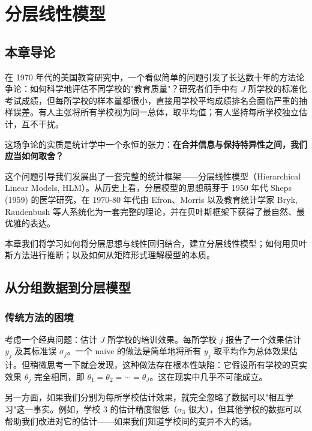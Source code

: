 
\chapter{分层线性模型}
\label{ch:hlm}

\section{本章导论}
\label{sec:ch15-intro}

在 1970 年代的美国教育研究中，一个看似简单的问题引发了长达数十年的方法论争论：如何科学地评估不同学校的"教育质量"？研究者们手中有 $J$ 所学校的标准化考试成绩，但每所学校的样本量都很小，直接用学校平均成绩排名会面临严重的抽样误差。有人主张将所有学校视为同一总体，取平均值；有人坚持每所学校独立估计，互不干扰。

这场争论的实质是统计学中一个永恒的张力：\textbf{在合并信息与保持特异性之间，我们应当如何取舍？}

这个问题引导我们发展出了一套完整的统计框架——分层线性模型（Hierarchical Linear Models, HLM）。从历史上看，分层模型的思想萌芽于 1950 年代 Sheps (1959) 的医学研究，在 1970-80 年代由 Efron、Morris 以及教育统计学家 Bryk, Raudenbush 等人系统化为一套完整的理论，并在贝叶斯框架下获得了最自然、最优雅的表达。

本章我们将学习如何将分层思想与线性回归结合，建立分层线性模型；如何用贝叶斯方法进行推断；以及如何从矩阵形式理解模型的本质。

\section{从分组数据到分层模型}
\label{sec:grouped-to-hierarchical}

\subsection{传统方法的困境}
\label{sec:traditional-dilemma}

考虑一个经典问题：估计 $J$ 所学校的培训效果。每所学校 $j$ 报告了一个效果估计 $y_j$ 及其标准误 $\sigma_j$。一个 naive 的做法是简单地将所有 $y_j$ 取平均作为总体效果估计。但稍微思考一下就会发现，这种做法存在根本性缺陷：它假设所有学校的真实效果 $\theta_j$ 完全相同，即 $\theta_1 = \theta_2 = \cdots = \theta_J$。这在现实中几乎不可能成立。

另一方面，如果我们分别为每所学校估计效果，就完全忽略了数据可以"相互学习"这一事实。例如，学校 3 的估计精度很低（$\sigma_3$ 很大），但其他学校的数据可以帮助我们改进对它的估计——如果我们知道学校间的变异不大的话。

